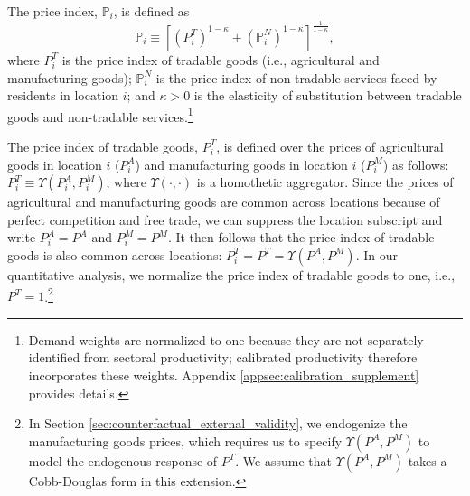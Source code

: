 \documentclass[12pt, unicode, a4paper]{article}
\newcommand{\1}{\mbox{1}\hspace{-0.25em}\mbox{l}} %
\begin{document}
The price index, $\mathbb{P}_{i}$, is defined as
\begin{equation}
\label{eq:price_index}
    \mathbb{P}_{i} \equiv
    \left[
    \left( P_{i}^T \right)^{1-\kappa}+
    \left( \mathbb{P}_{i}^N \right)^{1-\kappa}
    \right]^\frac{1}{1-\kappa},
\end{equation}
where $P_i^T$ is the price index of tradable goods (i.e., agricultural and manufacturing goods); $\mathbb{P}_{i}^N$ is the price index of non-tradable services faced by residents in location $i$;  and $\kappa>0$ is the elasticity of substitution between tradable goods and non-tradable services.\footnote{Demand weights are normalized to one because they are not separately identified from sectoral productivity; calibrated productivity therefore incorporates these weights. Appendix \ref{appsec:calibration_supplement} provides details.}

The price index of tradable goods, $P_i^T$, is defined over the prices of agricultural goods in location $i$ ($P_i^A$) and manufacturing goods in location $i$ ($P_i^M$) as follows: $P_i^T \equiv \Upsilon(P_i^A,P_i^M)$, where $\Upsilon(\cdot,\cdot )$ is a homothetic aggregator. Since the prices of agricultural and manufacturing goods are common across locations because of perfect competition and free trade, we can suppress the location subscript and write $P_i^A=P^A$ and $P_i^M=P^M$. It then follows that the price index of tradable goods is also common across locations: $P_i^T=P^T=\Upsilon(P^A,P^M)$. In our quantitative analysis, we normalize the price index of tradable goods to one, i.e., $P^T=1$.\footnote{
In Section \ref{sec:counterfactual_external_validity}, we endogenize the manufacturing goods prices, which requires us to specify $\Upsilon(P^A,P^M)$ to model the endogenous response of $P^T$. We assume that $\Upsilon(P^A,P^M)$ takes a Cobb-Douglas form in this extension.
}
\end{document}
